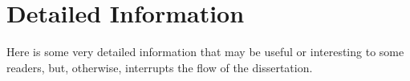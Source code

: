 %
%
%

\chapter{Detailed Information}
\label{app:detInfo}

Here is some very detailed information that may be useful or interesting to some readers, but, otherwise, interrupts the flow of the dissertation.
